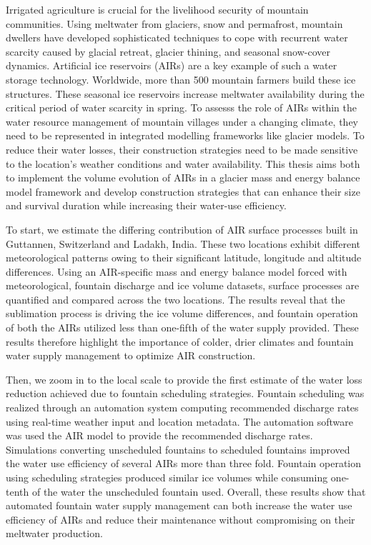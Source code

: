 %
\label{sec:abstract}

Irrigated agriculture is crucial for the livelihood security of mountain communities. Using meltwater from
glaciers, snow and permafrost, mountain dwellers have developed sophisticated techniques to cope with recurrent
water scarcity caused by glacial retreat, glacier thining, and seasonal snow-cover dynamics. Artificial ice
reservoirs (AIRs) are a key example of such a water storage technology. Worldwide, more than 500 mountain
farmers build these ice structures. These seasonal ice reservoirs increase meltwater availability during the
critical period of water scarcity in spring. To assesss the role of AIRs within the water resource management of
mountain villages under a changing climate, they need to be represented in integrated modelling frameworks like
glacier models. To reduce their water losses, their construction strategies need to be made sensitive to the
location's weather conditions and water availability. This thesis aims both to implement the volume evolution of
AIRs in a glacier mass and energy balance model framework and develop construction strategies that can enhance
their size and survival duration while increasing their water-use efficiency. 

To start, we estimate the differing contribution of AIR surface processes built in Guttannen, Switzerland and
Ladakh, India. These two locations exhibit different meteorological patterns owing to their significant
latitude, longitude and altitude differences. Using an AIR-specific mass and energy balance model forced with
meteorological, fountain discharge and ice volume datasets, surface processes are quantified and compared across
the two locations. The results reveal that the sublimation process is driving the ice volume differences, and
fountain operation of both the AIRs utilized less than one-fifth of the water supply provided. These results
therefore highlight the importance of colder, drier climates and fountain water supply management to optimize
AIR construction.  

Then, we zoom in to the local scale to provide the first estimate of the water loss reduction achieved due to
fountain scheduling strategies. Fountain scheduling was realized through an automation system computing
recommended discharge rates using real-time weather input and location metadata. The automation software was
used the AIR model to provide the recommended discharge rates. Simulations converting unscheduled fountains to
scheduled fountains improved the water use efficiency of several AIRs more than three fold. Fountain operation
using scheduling strategies produced similar ice volumes while consuming one-tenth of the water the unscheduled
fountain used.  Overall, these results show that automated fountain water supply management can both increase
the water use efficiency of AIRs and reduce their maintenance without compromising on their meltwater
production.

